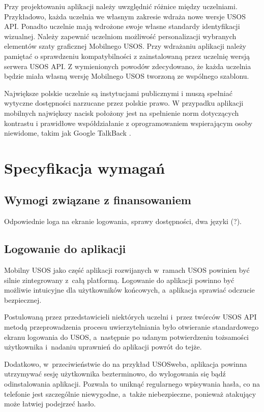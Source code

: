 \documentclass{pracamgr}
\begin{document}
Przy projektowaniu aplikacji należy uwzględnić różnice między uczelniami.
Przykładowo, każda uczelnia we własnym zakresie wdraża nowe wersje USOS API.
Ponadto uczelnie mają wdrożone swoje własne standardy identyfikacji wizualnej.
Należy zapewnić uczelniom możliwość personalizacji wybranych elementów szaty
graficznej Mobilnego USOS. Przy wdrażaniu aplikacji należy pamiętać o
sprawdzeniu kompatybilności z zainstalowaną przez uczelnię wersją serwera USOS API.
Z wymienionych powodów zdecydowano, że każda uczelnia będzie miała własną
wersję Mobilnego USOS tworzoną ze wspólnego szablonu.

Największe polskie uczelnie są instytucjami publicznymi i muszą spełniać wytyczne
dostępności narzucane przez polskie prawo. W przypadku aplikacji mobilnych
największy nacisk położony jest na spełnienie norm dotyczących kontrastu i prawidłowe
współdziałanie z oprogramowaniem wspierającym osoby niewidome, takim jak Google
TalkBack \cite{talkback}.

\chapter{Specyfikacja wymagań}

\section{Wymogi związane z finansowaniem}

Odpowiednie loga na ekranie logowania, sprawy dostępności, dwa języki (?).

\section{Logowanie do aplikacji}

Mobilny USOS jako część aplikacji rozwijanych w~ramach USOS powinien być silnie 
zintegrowany z~całą platformą. Logowanie do aplikacji powinno być możliwie
intuicyjne dla użytkowników końcowych, a~aplikacja sprawiać odczucie bezpiecznej.

Postulowaną przez przedstawicieli niektórych uczelni i~przez twórców USOS API
metodą przeprowadzenia procesu uwierzytelniania było otwieranie standardowego ekranu
logowania do USOS, a~następnie po udanym potwierdzeniu tożsamości użytkownika
i~nadaniu uprawnień do aplikacji powrót do tejże.

Dodatkowo, w~przeciwieństwie do na przykład USOSweba, aplikacja powinna utrzymywać
sesję użytkownika bezterminowo, do wylogowania się bądź odinstalowania aplikacji.
Pozwala to uniknąć regularnego wpisywania hasła, co na telefonie jest szczególnie
niewygodne, a~także niebezpieczne, ponieważ atakujący może łatwiej podejrzeć hasło.
\end{document}
